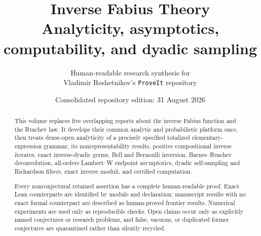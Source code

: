 \documentclass[11pt,oneside]{article}
\title{\bfseries Inverse Fabius Theory\\[0.35em]
\large Analyticity, asymptotics, computability, and dyadic sampling}
\author{Human-readable research synthesis for\\
\small Vladimir Reshetnikov's \texttt{ProveIt} repository}
\date{Consolidated repository edition: 31 August 2026}
\numberwithin{equation}{section}
\theoremstyle{definition}
\theoremstyle{remark}
\begin{document}
\maketitle

\begin{abstract}
This volume replaces five overlapping reports about the inverse Fabius
function and the Rvachev law.  It develops their common analytic and
probabilistic platform once, then treats dense-open analyticity of a precisely
specified totalized elementary-expression grammar, its nonrepresentability
results, positive compositional inverse
iterates, exact inverse-dyadic germs, Bell and Bernoulli inversion,
Barnes--Rvachev deconvolution, all-orders Lambert--W endpoint asymptotics,
dyadic self-sampling and Richardson filters, exact inverse moduli, and
certified computation.

Every nonconjectural retained assertion has a complete human-readable proof.
Exact Lean counterparts are identified by module and declaration; manuscript
results with no exact formal counterpart are described as human-proved
frontier results.  Numerical experiments are used only as reproducible checks.
Open claims occur only as explicitly named conjectures or research problems,
and false, vacuous, or duplicated former conjectures are quarantined rather
than silently recycled.
\end{abstract}

\tableofcontents
\clearpage










\end{document}
